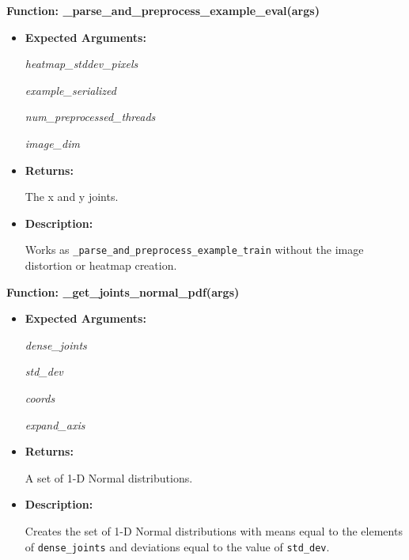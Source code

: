 \documentclass{scrreprt}
\begin{document}
\textbf{Function: \_parse\_and\_preprocess\_example\_eval(args)}
\begin{itemize}
    \item \textbf{Expected Arguments:}

            \quad\textit{heatmap\_stddev\_pixels}

            \quad\textit{example\_serialized}

            \quad\textit{num\_preprocessed\_threads}

            \quad\textit{image\_dim}

    \item \textbf{Returns:}

            The x and y joints.

    \item \textbf{Description:}

            Works as \verb|_parse_and_preprocess_example_train| without the
                image distortion or heatmap creation.

\end{itemize}

\textbf{Function: \_get\_joints\_normal\_pdf(args)}
\begin{itemize}
    \item \textbf{Expected Arguments:}

            \quad\textit{dense\_joints}

            \quad\textit{std\_dev}

            \quad\textit{coords}

            \quad\textit{expand\_axis}

    \item \textbf{Returns:}

            A set of 1-D Normal distributions.

    \item \textbf{Description:}

            Creates the set of 1-D Normal distributions with means equal to the
                elements of \verb|dense_joints| and deviations equal to the
                value of \verb|std_dev|.

\end{itemize}
\end{document}
